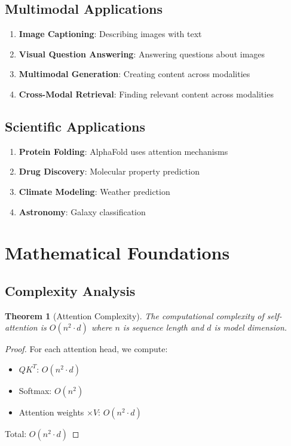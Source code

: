 \documentclass[11pt,a4paper]{article}
\newtheorem{theorem}{Theorem}[section]
\begin{document}
\subsection{Multimodal Applications}

\begin{enumerate}
\item \textbf{Image Captioning}: Describing images with text
\item \textbf{Visual Question Answering}: Answering questions about images
\item \textbf{Multimodal Generation}: Creating content across modalities
\item \textbf{Cross-Modal Retrieval}: Finding relevant content across modalities
\end{enumerate}

\subsection{Scientific Applications}

\begin{enumerate}
\item \textbf{Protein Folding}: AlphaFold uses attention mechanisms
\item \textbf{Drug Discovery}: Molecular property prediction
\item \textbf{Climate Modeling}: Weather prediction
\item \textbf{Astronomy}: Galaxy classification
\end{enumerate}

\section{Mathematical Foundations}

\subsection{Complexity Analysis}

\begin{theorem}[Attention Complexity]
The computational complexity of self-attention is $O(n^2 \cdot d)$ where $n$ is sequence length and $d$ is model dimension.
\end{theorem}

\begin{proof}
For each attention head, we compute:
\begin{itemize}
\item $QK^T$: $O(n^2 \cdot d)$
\item Softmax: $O(n^2)$
\item Attention weights $\times V$: $O(n^2 \cdot d)$
\end{itemize}
Total: $O(n^2 \cdot d)$
\end{proof}
\end{document}
